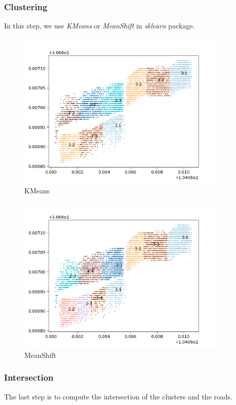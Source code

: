 \documentclass[fontset=none]{ctexart}
\theoremstyle{definition}
\theoremstyle{remark}
\begin{document}
\clearpage
\subsubsection{Clustering}
In this step, we use \textit{KMeans} or \textit{MeanShift} in \textit{sklearn} package.
\begin{figure}[htb]
  \centering
  \includegraphics[width=0.9\textwidth]{images/kmeans_new.png}
  \caption{KMeans}
  \label{fig: kmeans}
\end{figure}
\clearpage
\begin{figure}[htb]
  \centering
  \includegraphics[width=0.9\textwidth]{images/meanshift.png}
  \caption{MeanShift}
  \label{fig: meanshift}
\end{figure}

\subsubsection{Intersection}
The last step is to compute the intersection of the clusters and the roads.
\end{document}
